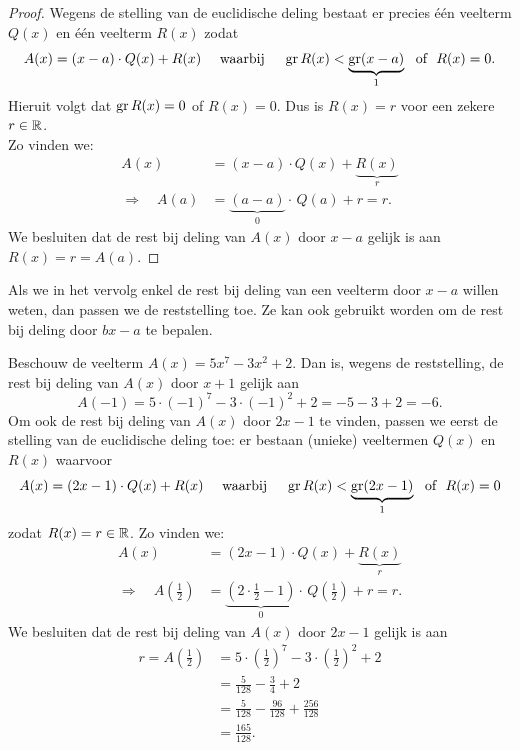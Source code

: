 \documentclass{ximera}
\begin{document}
\begin{proof}

Wegens de stelling van de euclidische deling bestaat er precies  \'e\'en veelterm $Q(x)$ en \'e\'en veelterm $R(x)$ zodat
\[
A(x) = (x-a)\cdot Q(x) + R(x) \quad \text{ waarbij } \quad \operatorname{gr} R(x) < \underbrace{\operatorname{gr} (x-a)}_{1} \,\, \text{ of } \,\, R(x) = 0.
\]
Hieruit volgt dat $\operatorname{gr} R(x) = 0$ of $R(x) = 0$. Dus is $R(x) = r$ voor een zekere $r \in \mathbb{R}$. \\
Zo vinden we:
\begin{align*}
A(x) & = (x-a) \cdot Q(x) + \underbrace{R(x)}_{r} \\
\Rightarrow \quad A(a) & = \underbrace{(a-a)}_{0} \cdot \, Q(a) + r = r. 
\end{align*}
We besluiten dat de rest bij deling van $A(x)$ door $x-a$ gelijk is aan $R(x) = r = A(a)$. 

\end{proof}


Als we in het vervolg enkel de rest bij deling van een veelterm door $x-a$ willen weten, dan passen we de reststelling toe. Ze kan ook gebruikt worden om de rest bij deling door $bx-a$ te bepalen. 

\begin{example} 
Beschouw de veelterm $A(x) = 5x^7 - 3x^2 + 2$. Dan is, wegens de reststelling, de rest bij deling van $A(x)$ door $x+1$ gelijk aan
\[
A(-1) = 5 \cdot (-1)^7 - 3 \cdot (-1)^2 + 2 = -5-3+2 = -6.
\]
Om ook de rest bij deling van $A(x)$ door $2x-1$ te vinden, passen we eerst de stelling van de euclidische deling toe: er bestaan (unieke) veeltermen $Q(x)$ en $R(x)$ waarvoor
\[
A(x) = (2x-1)\cdot Q(x) + R(x) \quad \text{ waarbij } \quad \operatorname{gr} R(x) < \underbrace{\operatorname{gr} (2x-1)}_{1} \,\, \text{ of } \,\, R(x) = 0
\]
zodat $R(x) = r \in \mathbb{R}$. Zo vinden we:
\begin{align*}
A(x) & = (2x-1) \cdot Q(x) + \underbrace{R(x)}_{r} \\
\Rightarrow \quad A\left(\frac{1}{2}\right) & = \underbrace{\left(2 \cdot \frac{1}{2}-1\right)}_{0} \cdot \,Q\left(\frac{1}{2}\right) + r = r. 
\end{align*} 
We besluiten dat de rest bij deling van $A(x)$ door $2x-1$ gelijk is aan
\begin{align*}
r = A\left(\frac{1}{2}\right) & = 5 \cdot \left(\frac{1}{2}\right)^7 - 3 \cdot \left(\frac{1}{2}\right)^2 + 2 \\
& = \frac{5}{128} - \frac{3}{4} + 2 \\
& = \frac{5}{128} - \frac{96}{128} + \frac{256}{128} \\
& = \frac{165}{128}.
\end{align*}
\end{example} 
\end{document}
